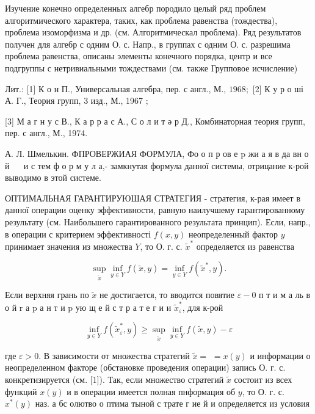 \documentclass[10pt]{article}
\begin{document}
Изучение конечно определенных алгебр породило целый ряд проблем алгоритмического характера, таких, как проблема равенства (тождества), проблема изоморфизма и др. (см. Алгоритмическал проблема). Ряд результатов получен для алгебр с одним О. с. Напр., в группах с одним О. с. разрешима проблема равенства, описаны элементы конечного порядка, центр и все подгруппы с нетривиальными тождествами (см. также Групповое исчисление)



Лит.: [1] К о н П., Универсальная алгебра, пер. с англ., М., $1968 ;$ [2] К у р о ші А. Г., Теория групп, 3 изд., М., 1967 ;

[3] М а г н у с В., К а р р а с А., С о л и т ә р Д., Комбинаторная теория групп, пер. с англ., М., 1974.



А. Л. Шмелькин. ФПРОВЕРЖИАЯ ФОРМУЛА, Фо о п р ов е $\mathrm{p}$ жи а я в да вн о й $\quad$ и с тем ф о р м у л а,- замкнутая формула данної системы, отрицание к-рой выводимо в этой системе.



ОПТИМАЛЬНАЯ ГАРАНТИРУЮШАЯ СТРАТЕГИЯ - стратегия, к-рая имеет в данної операции оценку эффективности, равную наилучшему гарантированному результату (см. Наибольшего гарантированного результата принцип). Если, напр., в операции с критерием эффективності $f(x, y)$ неопределенный фактор $y$ принимает значения из множества $Y$, то О. г. с. $\tilde{x}^{*}$ определяется из равенства



\[

\sup _{\tilde{x}} \inf _{y \in Y} f(\tilde{x}, y)=\inf _{y \in Y} f\left(\tilde{x}^{*}, y\right) .

\]



Если верхняя грань по $\tilde{x}$ не достигается, то вводится повятие $\varepsilon-0$ п т и м а ль в о й $\mathrm{r}$ а $\mathrm{p}$ а н т и $\mathrm{p}$ ую щ е й с т р а т е г и и $\tilde{x}_{\varepsilon}^{*}$, для к-рой



\[

\inf _{y \in Y} f\left(\tilde{x}_{\varepsilon}^{*}, y\right) \geqslant \sup _{\tilde{x}} \inf _{y \in Y} f(\tilde{x}, y)-\varepsilon

\]



где $\varepsilon>0$. В зависимости от множества стратегий $\tilde{x}=$ $=x(y)$ и информации о неопределенном факторе (обстановке проведения операции) запись О. г. с. конкретизируется (см. [1]). Так, если множество стратегий $\tilde{x}$ состоит из всех функций $x(y)$ и в операции имеется полная пнформация об $y$, то О. г. с. $x^{*}(y)$ наз. а бс олютво о птима тыной с трате г ие й и определяется из условия
\end{document}
